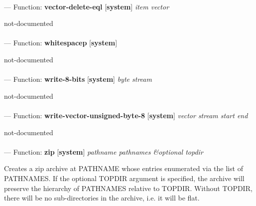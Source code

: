 \paragraph{}
\label{SYSTEM:VECTOR-DELETE-EQL}
--- Function: \textbf{vector-delete-eql} [\textbf{system}] \textit{item vector}

\begin{adjustwidth}{5em}{5em}
not-documented
\end{adjustwidth}

\paragraph{}
\label{SYSTEM:WHITESPACEP}
--- Function: \textbf{whitespacep} [\textbf{system}] \textit{}

\begin{adjustwidth}{5em}{5em}
not-documented
\end{adjustwidth}

\paragraph{}
\label{SYSTEM:WRITE-8-BITS}
--- Function: \textbf{write-8-bits} [\textbf{system}] \textit{byte stream}

\begin{adjustwidth}{5em}{5em}
not-documented
\end{adjustwidth}

\paragraph{}
\label{SYSTEM:WRITE-VECTOR-UNSIGNED-BYTE-8}
--- Function: \textbf{write-vector-unsigned-byte-8} [\textbf{system}] \textit{vector stream start end}

\begin{adjustwidth}{5em}{5em}
not-documented
\end{adjustwidth}

\paragraph{}
\label{SYSTEM:ZIP}
--- Function: \textbf{zip} [\textbf{system}] \textit{pathname pathnames \&optional topdir}

\begin{adjustwidth}{5em}{5em}
Creates a zip archive at PATHNAME whose entries enumerated via the list of PATHNAMES.
If the optional TOPDIR argument is specified, the archive will preserve the hierarchy of PATHNAMES relative to TOPDIR.  Without TOPDIR, there will be no sub-directories in the archive, i.e. it will be flat.
\end{adjustwidth}

